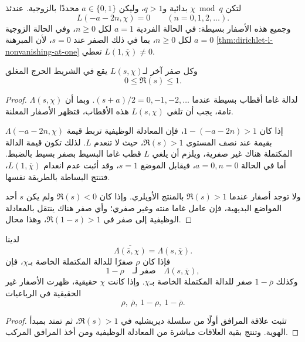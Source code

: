 \begin{corollary}
\label{cor:dirichlet-l-trivial-zeros}
\provedhere
لتكن \(\chi\bmod q\) بدائية و\(q>1\)، وليكن
\(a\in\{0,1\}\) محددًا بالزوجية. عندئذ
\[
L(-a-2n,\chi)=0
\qquad(n=0,1,2,\ldots).
\]
وجميع هذه الأصفار بسيطة: في الحالة الفردية \(a=1\) لكل \(n\geq0\)،
وفي الحالة الزوجية \(a=0\) لكل \(n\geq0\)، بما في ذلك الصفر عند
\(s=0\)، لأن المبرهنة \ref{thm:dirichlet-l-nonvanishing-at-one} تعطي
\(L(1,\overline\chi)\ne0\).

وكل صفر آخر لـ\(L(s,\chi)\) يقع في الشريط الحرج المغلق
\[
0\leq\Re(s)\leq1.
\]
\end{corollary}

\begin{proof}
لدالة غاما أقطاب بسيطة عندما
\((s+a)/2=0,-1,-2,\ldots\). وبما أن \(\Lambda(s,\chi)\) تامة، يجب أن
تلغي \(L(s,\chi)\) هذه الأقطاب، فتظهر الأصفار المعلنة.

إذا كان \(1-(-a-2n)>1\)، فإن المعادلة الوظيفية تربط قيمة
\(\Lambda(-a-2n,\chi)\) بقيمة عند نصف المستوى \(\Re(s)>1\)، حيث
لا تنعدم \(L\). لذلك تكون قيمة الدالة المكتملة هناك غير صفرية، ويلزم أن
يلغي \(L\) قطب غاما البسيط بصفر بسيط بالضبط. أما في الحالة
\(a=0,n=0\)، فيقابل الموضع \(s=1\)، وقد أثبت عدم انعدام
\(L(1,\overline\chi)\)، فتنتج البساطة بالطريقة نفسها.

ولا توجد أصفار عندما \(\Re(s)>1\) بالمنتج الأويلري. وإذا كان
\(\Re(s)<0\) ولم يكن \(s\) أحد المواضع البديهية، فإن عامل غاما منته
وغير صفري؛ وأي صفر هناك ينتقل بالمعادلة الوظيفية إلى صفر في
\(\Re(1-s)>1\)، وهذا محال.
\end{proof}

\begin{proposition}
\label{prop:dirichlet-l-zero-symmetry}
\provedhere
لدينا
\[
\overline{\Lambda(\overline s,\chi)}
=
\Lambda(s,\overline\chi).
\]
فإذا كان \(\rho\) صفرًا للدالة المكتملة الخاصة بـ\(\chi\)، فإن
\[
1-\rho
\quad\text{صفر لـ}\quad\Lambda(s,\overline\chi),
\]
وكذلك \(1-\overline\rho\) صفر للدالة المكتملة الخاصة بـ\(\chi\).
وإذا كانت \(\chi\) حقيقية، ظهرت الأصفار غير الحقيقية في الرباعيات
\[
\rho,\ \overline\rho,\ 1-\rho,\ 1-\overline\rho.
\]
\end{proposition}

\begin{proof}
تثبت علاقة المرافق أولًا من سلسلة ديريشليه في \(\Re(s)>1\)، ثم تمتد
بمبدأ الهوية. وتنتج بقية العلاقات مباشرة من المعادلة الوظيفية ومن أخذ
المرافق المركب.
\end{proof}

